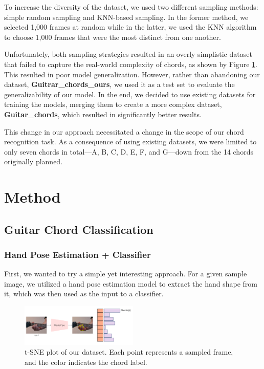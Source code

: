 \documentclass[10pt,twocolumn,letterpaper]{article}
\begin{document}
To increase the diversity of the dataset, we used two different sampling methods: simple random sampling and KNN-based sampling. In the former method, we selected 1,000 frames at random while in the latter, we used the KNN algorithm to choose 1,000 frames that were the most distinct from one another.

Unfortunately, both sampling strategies resulted in an overly simplistic dataset that failed to capture the real-world complexity of chords, as shown by Figure \ref{fig:ours-tsne-plot}. This resulted in poor model generalization. However, rather than abandoning our dataset, \textbf{Guitrar\_chords\_ours}, we used it as a test set to evaluate the generalizability of our model. In the end, we decided to use existing datasets \cite{guitar-chord-tvon8_dataset,guitar-chord-bounding-box_dataset, guitar-chord-handshape_dataset, guitar-chords-daewp_dataset} for training the models, merging them to create a more complex dataset, \textbf{Guitar\_chords}, which resulted in significantly better results.

This change in our approach necessitated a change in the scope of our chord recognition task. As a consequence of using existing datasets, we were limited to only seven chords in total—A, B, C, D, E, F, and G—down from the 14 chords originally planned.

\section{Method}

\subsection{Guitar Chord Classification}

\subsubsection{Hand Pose Estimation + Classifier}
First, we wanted to try a simple yet interesting approach. For a given sample image, we utilized a hand pose estimation model to extract the hand shape from it, which was then used as the input to a classifier.

\begin{figure}[h]
  \centering
  \includegraphics[width=0.5\textwidth]{images/final/hand_pose_estimation_classifier.png}
  \caption{t-SNE plot of our dataset. Each point represents a sampled frame, and the color indicates the chord label. }
  \label{fig:ours-tsne-plot}
\end{figure}
\end{document}
